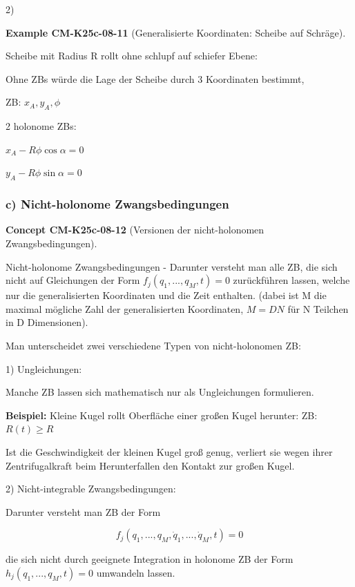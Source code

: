 \documentclass[10pt, letterpaper]{article}
\newcommand{\CustomHeading}[3]{%
  \par\medskip\noindent%
  \textbf{#1 #2} \textnormal{(#3)}.\enskip%
}
\newenvironment{EXA}[2]{\begin{unitbox}\CustomHeading{Example}{#1}{#2}}{\end{unitbox}}
\newenvironment{CONC}[2]{\begin{unitbox}\CustomHeading{Concept}{#1}{#2}}{\end{unitbox}}
\begin{document}
2) 

\begin{EXA}{CM-K25c-08-11}{Generalisierte Koordinaten: Scheibe auf Schräge}
Scheibe mit Radius R rollt ohne schlupf auf schiefer Ebene:


Ohne ZBs würde die Lage der Scheibe durch 3 Koordinaten bestimmt,

ZB: $x_A, y_A, \phi$

2 holonome ZBs:

$x_A - R\phi \cos\alpha = 0$

$y_A - R\phi \sin\alpha = 0$
\end{EXA}


\subsubsection{c) Nicht-holonome Zwangsbedingungen}


\begin{CONC}{CM-K25c-08-12}{Versionen der nicht-holonomen Zwangsbedingungen}
Nicht-holonome Zwangsbedingungen - Darunter versteht man alle ZB, die sich nicht auf Gleichungen der Form $f_j(q_1,...,q_M,t)=0$ zurückführen lassen, welche nur die generalisierten Koordinaten und die Zeit enthalten. (dabei ist M die maximal mögliche Zahl der generalisierten Koordinaten, $M=DN$ für N Teilchen in D Dimensionen).

Man unterscheidet zwei verschiedene Typen von nicht-holonomen ZB:

1) Ungleichungen:

Manche ZB lassen sich mathematisch nur als Ungleichungen formulieren.

\textbf{Beispiel:} Kleine Kugel rollt Oberfläche einer großen Kugel herunter:
ZB: $R(t) \geq R$

Ist die Geschwindigkeit der kleinen Kugel groß genug, verliert sie wegen ihrer Zentrifugalkraft beim Herunterfallen den Kontakt zur großen Kugel.

2) Nicht-integrable Zwangsbedingungen:

Darunter versteht man ZB der Form

\[f_j(q_1,...,q_M,\dot{q}_1,...,\dot{q}_M,t) = 0\]

die sich nicht durch geeignete Integration in holonome ZB der Form $h_j(q_1,...,q_M,t)=0$ umwandeln lassen.
\end{CONC}
\end{document}

